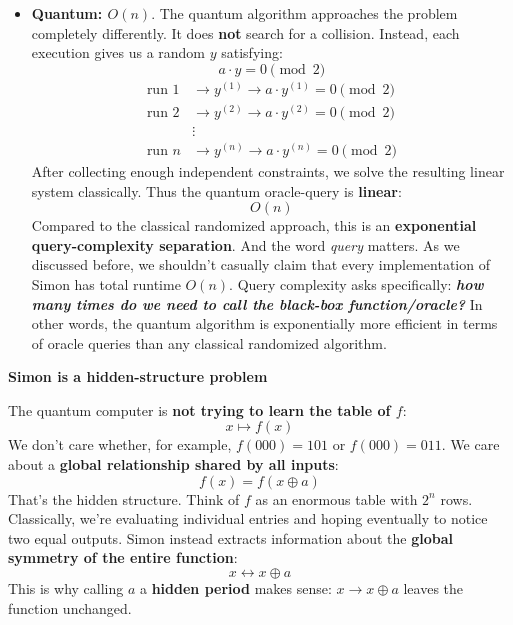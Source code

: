 \begin{itemize}
    \item[\textcolor{Green3}{\faIcon{tachometer-alt}}] \textbf{Quantum: $O(n)$}. The quantum algorithm approaches the problem completely differently. It does \textbf{not} search for a collision. Instead, each execution gives us a random $y$ satisfying:
        \begin{equation*}
            a \cdot y = 0 \pmod 2
        \end{equation*}
        \begin{align*}
            \text{run } 1 &\to y^{(1)} \to a \cdot y^{(1)} = 0 \pmod 2 \\
            \text{run } 2 &\to y^{(2)} \to a \cdot y^{(2)} = 0 \pmod 2 \\
            &\vdots \\
            \text{run } n &\to y^{(n)} \to a \cdot y^{(n)} = 0 \pmod 2
        \end{align*}
        After collecting enough independent constraints, we solve the resulting linear system classically. Thus the quantum oracle-query is \textbf{linear}:
        \begin{equation*}
            O(n)
        \end{equation*}
        Compared to the classical randomized approach, this is an \textbf{exponential query-complexity separation}. And the word \emph{query} matters. As we discussed before, we shouldn't casually claim that every implementation of Simon has total runtime $O(n)$. Query complexity asks specifically: \emph{\textbf{how many times do we need to call the black-box function/oracle?}} In other words, the quantum algorithm is exponentially more efficient in terms of oracle queries than any classical randomized algorithm.
\end{itemize}

\highspace
\begin{flushleft}
    \textcolor{Green3}{ \textbf{Simon is a hidden-structure problem}}
\end{flushleft}
The quantum computer is \textbf{not trying to learn the table of $f$}:
\begin{equation*}
    x \mapsto f(x)
\end{equation*}
We don't care whether, for example, $f(000) = 101$ or $f(000) = 011$. We care about a \textbf{global relationship shared by all inputs}:
\begin{equation*}
    f(x) = f(x \oplus a)
\end{equation*}
That's the hidden structure. Think of $f$ as an enormous table with $2^n$ rows. Classically, we're evaluating individual entries and hoping eventually to notice two equal outputs. Simon instead extracts information about the \textbf{global symmetry of the entire function}:
\begin{equation*}
    x \leftrightarrow x \oplus a
\end{equation*}
This is why calling $a$ a \textbf{hidden period} makes sense: $x \to x \oplus a$ leaves the function unchanged.


